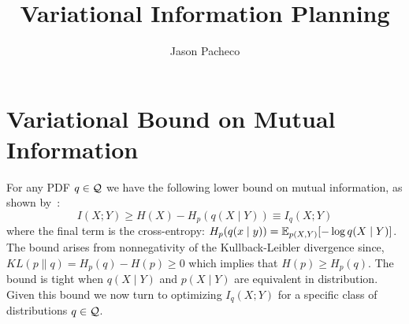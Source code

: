 \documentclass{article}
\title{Variational Information Planning}
\author{
  Jason Pacheco
}
\begin{document}
\maketitle


\section{Variational Bound on Mutual Information}\label{sec:varinf_bound}

For any PDF $q\in\mathcal{Q}$ we have the following lower bound on mutual
information, as shown by~\cite{agakov2004algorithm}:
\begin{equation}\label{eq:varmi}
  I(X;Y) \geq H(X) - H_p( q(X\mid Y) ) \equiv I_q(X;Y)
\end{equation}
where the final term is the cross-entropy: $H_p(q(x\mid y)) =
\operatorname{\mathbb{E}}_{p(X,Y)}[ - \log q(X\mid Y)]$.  The bound arises from nonnegativity
of the Kullback-Leibler divergence since, $KL(p\|q) = H_p(q) - H(p)
\geq 0$ which implies that $H(p) \geq H_p(q)$.  The bound is tight
when $q(X\mid Y)$ and $p(X\mid Y)$ are equivalent in distribution.
Given this bound we now turn to optimizing $I_q(X;Y)$ for a specific
class of distributions $q\in\mathcal{Q}$.
\end{document}
